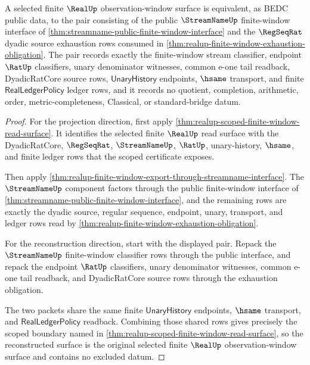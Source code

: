 \begin{theorem}
\label{thm:realup-streamname-regseqrat-window-correspondence}
A selected finite $\RealUp$ observation-window surface is equivalent, as BEDC
public data, to the pair consisting of the public $\StreamNameUp$ finite-window
interface of \autoref{thm:streamname-public-finite-window-interface} and the
$\RegSeqRat$ dyadic source exhaustion rows consumed in
\autoref{thm:realup-finite-window-exhaustion-obligation}. The pair records
exactly the finite-window stream classifier, endpoint $\RatUp$ classifiers,
unary denominator witnesses, common e-one tail readback, DyadicRatCore source
rows, $\mathsf{UnaryHistory}$ endpoints, $\hsame$ transport, and finite
$\mathsf{RealLedgerPolicy}$ ledger rows, and it records no quotient,
completion, arithmetic, order, metric-completeness, Classical, or
standard-bridge datum.
\end{theorem}
\begin{proof}
For the projection direction, first apply
\autoref{thm:realup-scoped-finite-window-read-surface}. It identifies the
selected finite $\RealUp$ read surface with the DyadicRatCore, $\RegSeqRat$,
$\StreamNameUp$, $\RatUp$, unary-history, $\hsame$, and finite ledger rows that
the scoped certificate exposes.

Then apply
\autoref{thm:realup-finite-window-export-through-streamname-interface}. The
$\StreamNameUp$ component factors through the public finite-window interface of
\autoref{thm:streamname-public-finite-window-interface}, and the remaining rows
are exactly the dyadic source, regular sequence, endpoint, unary, transport,
and ledger rows read by
\autoref{thm:realup-finite-window-exhaustion-obligation}.

For the reconstruction direction, start with the displayed pair. Repack the
$\StreamNameUp$ finite-window classifier rows through the public interface, and
repack the endpoint $\RatUp$ classifiers, unary denominator witnesses, common
e-one tail readback, and DyadicRatCore source rows through the exhaustion
obligation.

The two packets share the same finite $\mathsf{UnaryHistory}$ endpoints,
$\hsame$ transport, and $\mathsf{RealLedgerPolicy}$ readback. Combining those
shared rows gives precisely the scoped boundary named in
\autoref{thm:realup-scoped-finite-window-read-surface}, so the reconstructed
surface is the original selected finite $\RealUp$ observation-window surface
and contains no excluded datum.
\end{proof}

